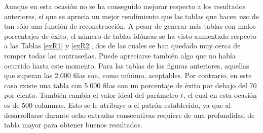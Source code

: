 \documentclass[12pt,spanish,listoffigures,listoftables]{tfgetsinf}
\begin{document}
\def\arraystretch{1.5}
\begin{table}[H]
	\centering
	\caption{Porcentajes de éxito para las tablas que emplean patrón grande}
	\label{exPG}
\end{table}

Aunque en esta ocasión no se ha conseguido mejorar respecto a los resultados anteriores, sí que se aprecia un mejor rendimiento que las tablas que hacen uso de tan sólo una función de reconstrucción. A pesar de generar más tablas con malos porcentajes de éxito, el número de tablas idóneas se ha visto aumentado respecto a las Tablas \ref{exR1} y \ref{exR2}, dos de las cuales se han quedado muy cerca de romper todas las contraseñas. Puede apreciarse también algo que no había ocurrido hasta este momento. Para las tablas de las figuras anteriores, aquellas que superan las 2.000 filas son, como mínimo, aceptables. Por contrario, en este caso existe una tabla con 5.000 filas con un porcentaje de éxito por debajo del 70 por ciento. También cambia el valor ideal del parámetro $t$, el cual en esta ocasión es de 500 columnas. Esto se le atribuye a el patrón establecido, ya que al desarrollarse durante ocho entradas consecutivas requiere de una profundidad de tabla mayor para obtener buenos resultados.
\end{document}
